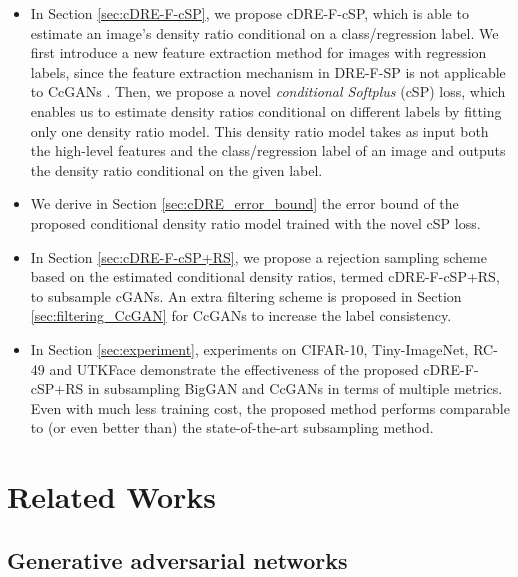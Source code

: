 \documentclass[10pt, twocolumn]{article}
\theoremstyle{definition}
\begin{document}
\begin{itemize}


	\item In Section \ref{sec:cDRE-F-cSP}, we propose cDRE-F-cSP, which is able to estimate an image's density ratio conditional on a class/regression label. We first introduce a new feature extraction method for images with regression labels, since the feature extraction mechanism in DRE-F-SP \cite{ding2020subsampling} is not applicable to CcGANs \cite{ding2021ccgan}. Then, we propose a novel \textit{conditional Softplus} (cSP) loss, which enables us to estimate density ratios conditional on different labels by fitting only one density ratio model. This density ratio model takes as input both the high-level features and the class/regression label of an image and outputs the density ratio conditional on the given label. 
	
	\item We derive in Section \ref{sec:cDRE_error_bound} the error bound of the proposed conditional density ratio model trained with the novel cSP loss.
	
	\item In Section \ref{sec:cDRE-F-cSP+RS}, we propose a rejection sampling scheme based on the estimated conditional density ratios, termed cDRE-F-cSP+RS, to subsample cGANs. An extra filtering scheme is proposed in Section \ref{sec:filtering_CcGAN} for CcGANs to increase the label consistency. 
	
	\item In Section \ref{sec:experiment}, experiments on CIFAR-10, Tiny-ImageNet, RC-49 and UTKFace demonstrate the effectiveness of the proposed cDRE-F-cSP+RS in subsampling BigGAN and CcGANs in terms of multiple metrics. Even with much less training cost, the proposed method performs comparable to (or even better than) the state-of-the-art subsampling method. 
	
	
	


\end{itemize}

\section{Related Works}\label{sec:related_work}

\subsection{Generative adversarial networks}\label{sec:related_GANs}
\end{document}

